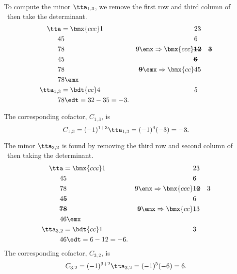 \medskip

{To compute the minor $\tta_{1,3}$, we remove the first row and third column of \tta\ then take the determinant. 
\begin{align*}
\tta &= \bmx{ccc}1&2&3\\4&5&6\\7&8&9\emx\Rightarrow\bmx{ccc}\textbf{\sout{1}}&\textbf{\sout{2}}&\textbf{\sout{3}}\\4&5&\textbf{\sout{6}}\\7&8&\textbf{\sout{9}}\emx\Rightarrow\bmx{cc}4&5\\7&8\emx \\
\tta_{1,3} &= \bdt{cc}4&5\\7&8\edt = 32-35 = -3.
\end{align*}
 
The corresponding cofactor, $C_{1,3}$, is
\[
C_{1,3} = (-1)^{1+3}\tta_{1,3} = (-1)^4(-3) = -3.
\]

The minor $\tta_{3,2}$ is found by removing the third row and second column of \tta\ then taking the determinant.
\begin{align*}
\tta &= \bmx{ccc}1&2&3\\4&5&6\\7&8&9\emx\Rightarrow\bmx{ccc}1&\textbf{\sout{2}}&3\\4&\textbf{\sout{5}}&6\\ \textbf{\sout{7}}&\textbf{\sout{8}}&\textbf{\sout{9}}\emx\Rightarrow \bmx{cc}1&3\\4&6\emx\\
\tta_{3,2} &= \bdt{cc}1&3\\4&6\edt = 6-12 = -6.
\end{align*} 
The corresponding cofactor, $C_{3,2}$, is
\[
C_{3,2} = (-1)^{3+2}\tta_{3,2} = (-1)^5(-6) = 6.
\]

\drawexampleline%

}
